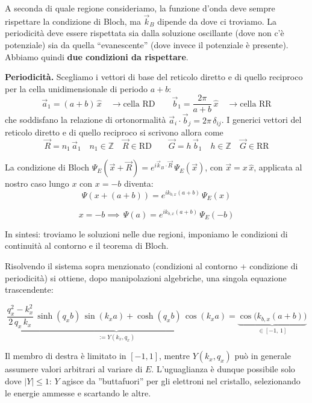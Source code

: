\begin{example}
A seconda di quale regione consideriamo, la funzione d'onda deve sempre rispettare la condizione di Bloch, ma \( \vec{k}_B \) dipende da dove ci troviamo. La periodicità deve essere rispettata sia dalla soluzione oscillante (dove non c'è potenziale) sia da quella ``evanescente'' (dove invece il potenziale è presente). Abbiamo quindi \textbf{due condizioni da rispettare}.

\textbf{Periodicità.} Scegliamo i vettori di base del reticolo diretto e di quello reciproco per la cella unidimensionale di periodo \( a + b \):
\begin{equation}
    \vec{a}_1 = (a + b)\, \hat{x} \quad \to \text{cella RD} \qquad \vec{b}_1 = \frac{2\pi}{a+b}\, \hat{x} \quad \to \text{cella RR}
\end{equation}
che soddisfano la relazione di ortonormalità \( \vec{a}_i \cdot \vec{b}_j = 2\pi\, \delta_{ij} \). I generici vettori del reticolo diretto e di quello reciproco si scrivono allora come
\begin{equation}
    \vec{R} = n_1\, \vec{a}_1 \quad n_1 \in \mathbb{Z} \quad \vec{R} \in \text{RD} \qquad
    \vec{G} = h\, \vec{b}_1 \quad h \in \mathbb{Z} \quad \vec{G} \in \text{RR}
\end{equation}

La condizione di Bloch \( \Psi_E(\vec{x} + \vec{R}) = e^{i \vec{k}_B \cdot \vec{R}}\, \Psi_E(\vec{x}) \), con \( \vec{x} = x\, \hat{x} \), applicata al nostro caso lungo \( x \) con \( x = -b \) diventa:
\begin{equation}
    \Psi(x + (a + b)) = e^{i k_{b,x} (a + b)}\, \Psi_E(x) 
\end{equation}
\begin{importantbox}
\begin{equation}
     x= -b \implies \, \Psi(a) = e^{i k_{b,x} (a + b)}\, \Psi_E(-b)
\end{equation}
\end{importantbox}

In sintesi: troviamo le soluzioni nelle due regioni, imponiamo le condizioni di continuità al contorno e il teorema di Bloch.

Risolvendo il sistema sopra menzionato (condizioni al contorno + condizione di periodicità) si ottiene, dopo manipolazioni algebriche, una singola equazione trascendente:
\begin{importantbox}
\begin{equation}
    \underbrace{\frac{q_x^2 - k_x^2}{2\, q_x\, k_x}\, \sinh(q_x b)\, \sin(k_x a) + \cosh(q_x b)\, \cos(k_x a)}_{\displaystyle := Y(k_x, q_x)} = \underbrace{\cos\bigl(k_{b,x} (a + b)\bigr)}_{\in [-1,\, 1]}
    \label{eq:kronig_penney}
\end{equation}
\end{importantbox}
Il membro di destra è limitato in \([-1, 1]\), mentre \( Y(k_x, q_x) \) può in generale assumere valori arbitrari al variare di \( E \). L'uguaglianza è dunque possibile solo dove \( |Y| \le 1 \): \( Y \) agisce da ''buttafuori'' per gli elettroni nel cristallo, selezionando le energie ammesse e scartando le altre.


\end{example}
